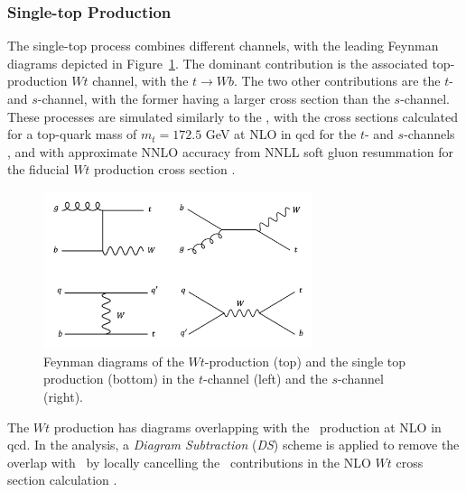 \subsubsection{Single-top Production}
The single-top process combines different channels, with the leading Feynman diagrams depicted in Figure~\ref{fig:feynstop}. The dominant contribution is the associated top-production $Wt$ channel, with the $t \rightarrow Wb$. The two other contributions are the $t$- and $s$-channel, with the former having a larger cross section than the $s$-channel. These processes are simulated similarly to the \ttb, with the cross sections calculated for a top-quark mass of $m_t = 172.5$ GeV at NLO in \gls{qcd} for the $t$- and $s$-channels \cite{ALIEV20111034, KANT201574}, and with approximate NNLO accuracy from NNLL soft gluon resummation for the fiducial $Wt$ production cross section \cite{PhysRevD.82.054018, kidonakis2013quark}.
\begin{figure}[h!]
  \center
  \includegraphics[width=0.7\textwidth]{Images/VH/Feynman/singletop.png}
  \caption{Feynman diagrams of the $Wt$-production (top) and the single top production (bottom) in the $t$-channel (left) and the $s$-channel (right).} 
  \label{fig:feynstop}
\end{figure}

The $Wt$ production has diagrams overlapping with the \ttb\ production at NLO in \gls{qcd}. In the analysis, a \textit{Diagram Subtraction} (\textit{DS}) scheme is applied to remove the overlap with \ttb\ by locally cancelling the \ttb\ contributions in the NLO $Wt$ cross section calculation \cite{StefanoFrixione_2008}. 

